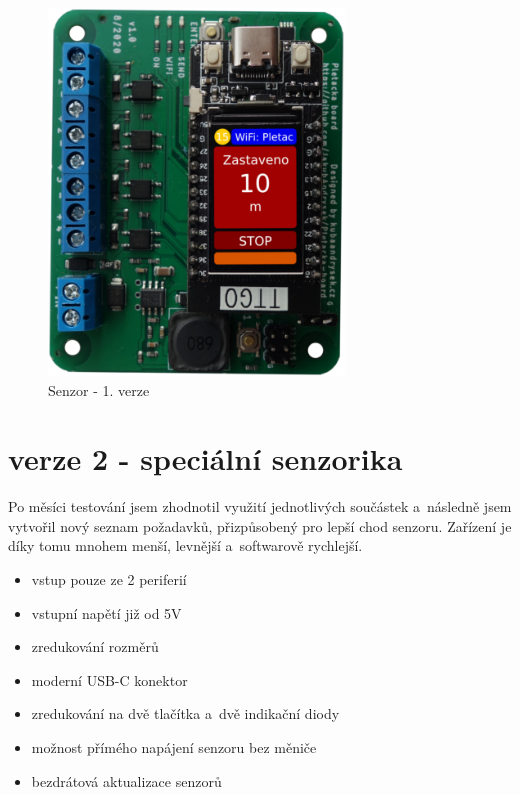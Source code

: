 \begin{figure}[htbp]
    \centering
    \includegraphics[width=0.7\textwidth]{img/V1-deska-esp-screen.png}
    \caption{Senzor - 1. verze}
    \label{fig:SenzorV1}
\end{figure}


\newpage



\section{verze 2 - speciální senzorika}

Po měsíci testování jsem zhodnotil využití jednotlivých součástek a~následně jsem vytvořil nový seznam požadavků, přizpůsobený pro lepší chod senzoru.
Zařízení je díky tomu mnohem menší, levnější a~softwarově rychlejší.

\begin{itemize}
    \item vstup pouze ze 2 periferií
    \item vstupní napětí již od 5V
    \item zredukování rozměrů
    \item moderní USB-C konektor
    \item zredukování na dvě tlačítka a~dvě indikační diody
    \item možnost přímého napájení senzoru bez měniče
    \item bezdrátová aktualizace senzorů
\end{itemize}

